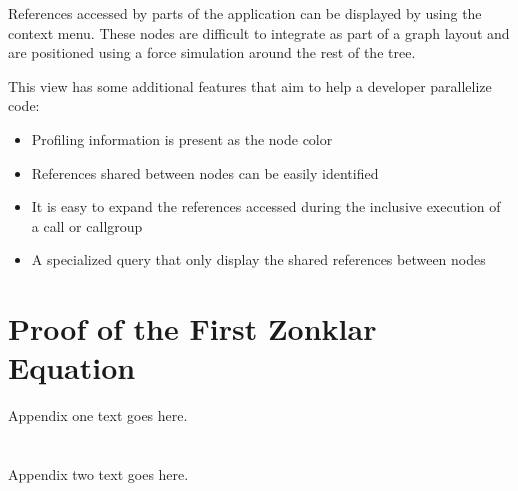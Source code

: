 \documentclass[conference]{IEEEtran}
\begin{document}
References accessed by parts of the application can be displayed by using the context menu. These nodes are difficult to integrate as part of a graph layout and are positioned using a force simulation around the rest of the tree.

This view has some additional features that aim to help a developer parallelize code:

\begin{itemize}
	\item Profiling information is present as the node color
	\item References shared between nodes can be easily identified
	\item It is easy to expand the references accessed during the inclusive execution of a call or callgroup
	\item A specialized query that only display the shared references between nodes
\end{itemize}

\appendices
\section{Proof of the First Zonklar Equation}
Appendix one text goes here.

\section{}
Appendix two text goes here.

\ifCLASSOPTIONcaptionsoff
  \newpage
\fi
\end{document}
